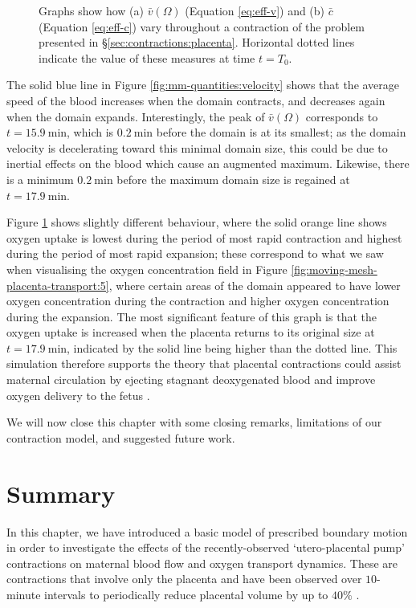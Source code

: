 \begin{figure}
\begin{subfigure}{0.45\textwidth}
                    \caption{}
                    \label{fig:mm-quantities:uptake}
                \end{subfigure}
                \caption{Graphs show how (a) $\bar{v}(\Omega)$ (Equation \eqref{eq:eff-v}) and (b) $\bar{c}$ (Equation \eqref{eq:eff-c}) vary throughout a contraction of the problem presented in \S\ref{sec:contractions:placenta}. Horizontal dotted lines indicate the value of these measures at time $t = T_0$.}
                \label{fig:mm-quantities}
            \end{figure}

            The solid blue line in Figure \ref{fig:mm-quantities:velocity} shows that the average speed of the blood increases when the domain contracts, and decreases again when the domain expands. Interestingly, the peak of $\bar{v}(\Omega)$ corresponds to $t = \qty{15.9}{\minute}$, which is $\qty{0.2}{\minute}$ before the domain is at its smallest; as the domain velocity is decelerating toward this minimal domain size, this could be due to inertial effects on the blood which cause an augmented maximum. Likewise, there is a minimum $\qty{0.2}{\minute}$ before the maximum domain size is regained at $t = \qty{17.9}{\minute}$.
            
            Figure \ref{fig:mm-quantities:uptake} shows slightly different behaviour, where the solid orange line shows oxygen uptake is lowest during the period of most rapid contraction and highest during the period of most rapid expansion; these correspond to what we saw when visualising the oxygen concentration field in Figure \ref{fig:moving-mesh-placenta-transport:5}, where certain areas of the domain appeared to have lower oxygen concentration during the contraction and higher oxygen concentration during the expansion. The most significant feature of this graph is that the oxygen uptake is increased when the placenta returns to its original size at $t = \qty{17.9}{\minute}$, indicated by the solid line being higher than the dotted line. This simulation therefore supports the theory that placental contractions could assist maternal circulation by ejecting stagnant deoxygenated blood and improve oxygen delivery to the fetus \cite{dellschaftHaemodynamicsHumanPlacenta2020}. 

            We will now close this chapter with some closing remarks, limitations of our contraction model, and suggested future work.

    \section{Summary} \label{sec:contractions:summary}
        In this chapter, we have introduced a basic model of prescribed boundary motion in order to investigate the effects of the recently-observed `utero-placental pump' contractions on maternal blood flow and oxygen transport dynamics. These are contractions that involve only the placenta and have been observed over $10$-minute intervals to periodically reduce placental volume by up to $40\%$ \cite{dellschaftHaemodynamicsHumanPlacenta2020}.

